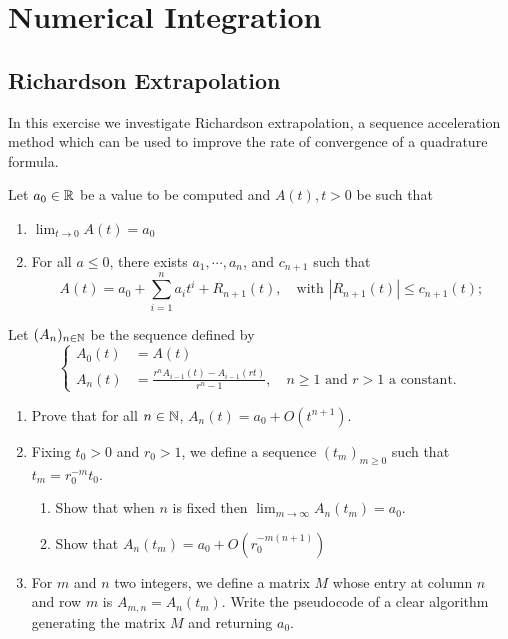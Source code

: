 \renewcommand{\chaptername}{Assignment}
\chapter{Numerical Integration}

\section{Richardson Extrapolation}
In this exercise we investigate Richardson extrapolation, a sequence acceleration method which can be used to improve the rate of convergence of a quadrature formula.

Let \(a_0\in\mathbb{R}\) be a value to be computed and \(A(t), t > 0\) be such that
\begin{enumerate}
	\item \(\lim_{t\to0}A(t)=a_0\)
	\item For all \(a\leq0\), there exists \(a_1,\cdots,a_n\), and \(c_{n+1}\) such that
	\[ A(t)=a_0+\sum_{i=1}^{n}a_i t^i+R_{n+1}(t),\quad\text{with } |R_{n+1}(t)|\leq c_{n+1}(t);  \]
\end{enumerate}
Let \((A_n)_{n\in\mathbb{N}}\) be the sequence defined by
\[ \begin{cases} A_0(t)&= A(t) \\ A_n(t)&=\frac{r^nA_{i-1}(t)-A_{i-1}(rt)}{r^n-1},\quad n\geq1 \text{ and } r>1 \text{ a constant.} \end{cases} \]
\begin{enumerate}
	\item Prove that for all \(n\in\mathbb{N}\), \(A_n(t)= a_0 + O(t^{n+1})\).
	\item Fixing \(t_0 > 0\) and \(r_0 > 1\), we define a sequence \((t_m)_{m\geq0}\) such that \(t_m = r_0^{-m} t_0\).
	\begin{enumerate}
		\item Show that when $n$ is fixed then \(\lim_{m\to\infty}A_n(t_m)=a_0\).
		\item Show that \(A_n(t_m)=a_0+O(r_0^{-m(n+1)}) \)
	\end{enumerate}
	\item For $m$ and $n$ two integers, we define a matrix $M$ whose entry at column $n$ and row $m$ is \(A_{m,n}=A_n(t_m)\).
	Write the pseudocode of a clear algorithm generating the matrix $M$ and returning $a_0$.
\end{enumerate}

